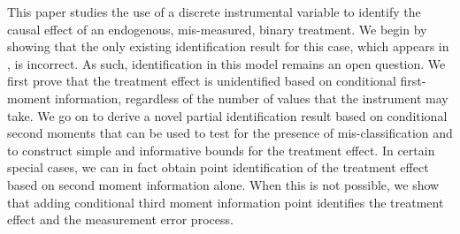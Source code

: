This paper studies the use of a discrete instrumental variable to identify the causal effect of an endogenous, mis-measured, binary treatment.
We begin by showing that the only existing identification result for this case, which appears in \cite{Mahajan}, is incorrect.
As such, identification in this model remains an open question.
We first prove that the treatment effect is unidentified based on conditional first-moment information, regardless of the number of values that the instrument may take.
We go on to derive a novel partial identification result based on conditional second moments that can be used to test for the presence of mis-classification and to construct simple and informative bounds for the treatment effect.
In certain special cases, we can in fact obtain point identification of the treatment effect based on second moment information alone.
When this is not possible, we show that adding conditional third moment information point identifies the treatment effect and the measurement error process.
